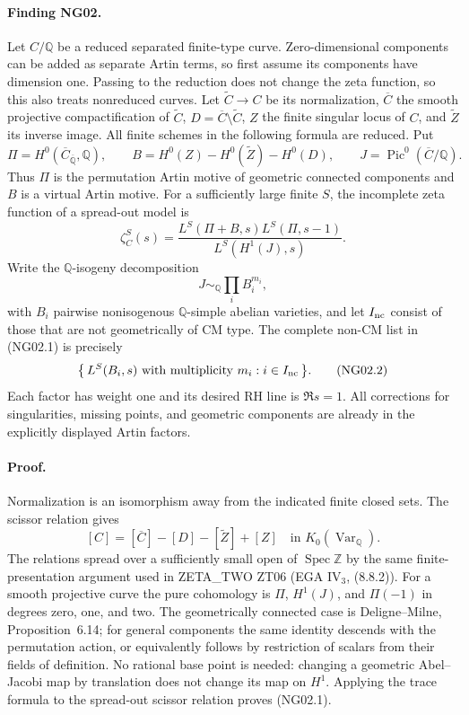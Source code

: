 \documentclass[11pt]{article}
\theoremstyle{remark}
\begin{document}
\paragraph{Finding NG02.}
Let $C/\mathbb Q$ be a reduced separated finite-type curve.  Zero-dimensional
components can be added as separate Artin terms, so first assume its
components have dimension one.  Passing to the reduction does not
change the zeta function, so this also treats nonreduced curves.
Let $\widetilde C\to C$ be its
normalization, $\overline C$ the smooth projective compactification of
$\widetilde C$, $D=\overline C\setminus\widetilde C$, $Z$ the finite
singular locus of $C$, and $\widetilde Z$ its inverse image.  All finite
schemes in the following formula are reduced.  Put
\[
 \Pi=H^0(\overline C_{\overline{\mathbb Q}},\mathbb Q),\qquad
 B=H^0(Z)-H^0(\widetilde Z)-H^0(D),\qquad
 J=\operatorname{Pic}^0(\overline C/\mathbb Q).
\]
Thus $\Pi$ is the permutation Artin motive of geometric connected
components and $B$ is a virtual Artin motive.  For a sufficiently
large finite $S$, the incomplete zeta function of a spread-out model is
\[
 \zeta^S_C(s)=
 \frac{L^S(\Pi+B,s)L^S(\Pi,s-1)}{L^S(H^1(J),s)}.             \tag{NG02.1}
\]
Write the $\mathbb Q$-isogeny decomposition
\[
                     J\sim_{\mathbb Q}\prod_i B_i^{m_i},
\]
with $B_i$ pairwise nonisogenous $\mathbb Q$-simple abelian varieties,
and let $I_{\rm nc}$ consist of those that are not geometrically of CM
type.  The complete non-CM list in (NG02.1) is precisely
\[
            \bigl\{\,L^S(B_i,s)\text{ with multiplicity }m_i:
                                i\in I_{\rm nc}\,\bigr\}.     \tag{NG02.2}
\]
Each factor has weight one and its desired RH line is $\Re s=1$.
All corrections for singularities, missing points, and geometric
components are already in the explicitly displayed Artin factors.

\paragraph{Proof.}
Normalization is an isomorphism away from the indicated finite closed
sets.  The scissor relation gives
\[
 [C]=[\overline C]-[D]-[\widetilde Z]+[Z]
                  \quad\text{in }K_0(\operatorname{Var}_{\mathbb Q}).
\]
The relations spread over a sufficiently small open of
$\operatorname{Spec}\mathbb Z$ by the same finite-presentation argument
used in ZETA\_TWO ZT06 (EGA IV$_3$, (8.8.2)).  For a smooth projective
curve the pure cohomology is $\Pi$, $H^1(J)$, and $\Pi(-1)$ in degrees
zero, one, and two.  The geometrically connected case is
Deligne--Milne, Proposition~6.14; for general components the same
identity descends with the permutation action, or equivalently follows
by restriction of scalars from their fields of definition.  No
rational base point is needed: changing a geometric Abel--Jacobi map
by translation does not change its map on $H^1$.  Applying
the trace formula to the spread-out scissor relation proves (NG02.1).
\end{document}
